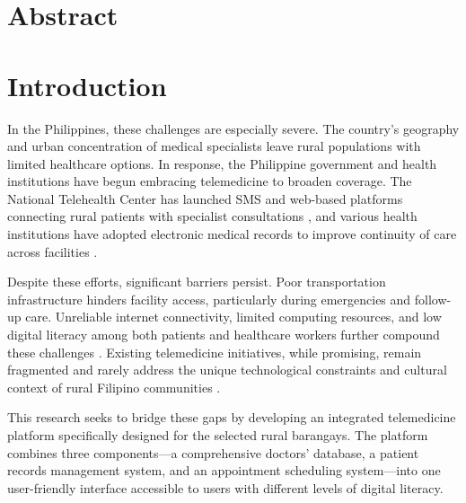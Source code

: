 \documentclass[12pt]{report}
\begin{document}
\tableofcontents
\clearpage

\listoffigures
\clearpage

\listoftables
\clearpage

\chapter*{\centering Abstract}
\clearpage

\chapter{Introduction}

\indent In the Philippines, these challenges are especially severe. The
country's geography and urban concentration of medical specialists leave rural
populations with limited healthcare options. In response, the Philippine
government and health institutions have begun embracing telemedicine to broaden
coverage. The National Telehealth Center has launched SMS and web-based
platforms connecting rural patients with specialist consultations
\cite{ref25, ref59}, and various health institutions have adopted electronic
medical records to improve continuity of care across facilities
\cite{ref36, ref40}.

Despite these efforts, significant barriers persist. Poor transportation
infrastructure hinders facility access, particularly during emergencies and
follow-up care. Unreliable internet connectivity, limited computing resources,
and low digital literacy among both patients and healthcare workers further
compound these challenges \cite{ref1, ref46}. Existing telemedicine
initiatives, while promising, remain fragmented and rarely address the unique
technological constraints and cultural context of rural Filipino communities
\cite{ref49, ref51}.

This research seeks to bridge these gaps by developing an integrated
telemedicine platform specifically designed for the selected rural barangays.
The platform combines three components---a comprehensive doctors' database,
a patient records management system, and an appointment scheduling system---into
one user-friendly interface accessible to users with different levels of
digital literacy.
\end{document}
